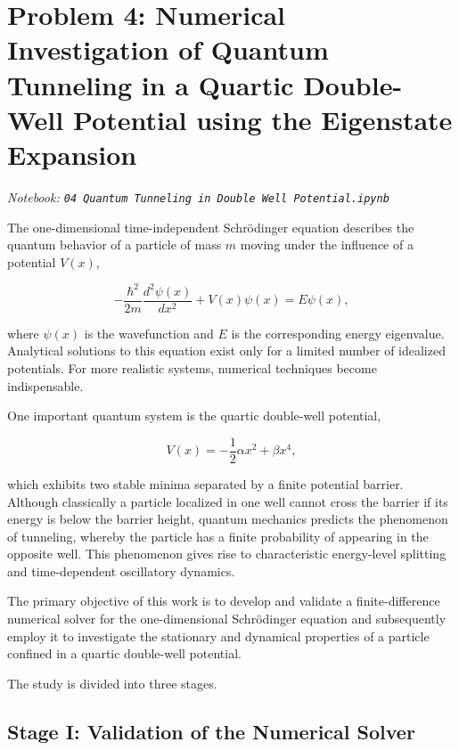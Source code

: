 \documentclass[11pt,a4paper]{article}
\begin{document}
\section{Problem 4: Numerical Investigation of Quantum Tunneling in a Quartic Double-Well Potential using the \textbf{Eigenstate Expansion}}
\textit{Notebook: \texttt{04 Quantum Tunneling in Double Well Potential.ipynb}}
\label{sec:problem4}


The one-dimensional time-independent Schrödinger equation describes the quantum behavior of a particle of mass $m$ moving under the influence of a potential $V(x)$,

\begin{equation}
-\frac{\hbar^2}{2m}\frac{d^2\psi(x)}{dx^2}+V(x)\psi(x)=E\psi(x),
\end{equation}

where $\psi(x)$ is the wavefunction and $E$ is the corresponding energy eigenvalue. Analytical solutions to this equation exist only for a limited number of idealized potentials. For more realistic systems, numerical techniques become indispensable.

One important quantum system is the quartic double-well potential,

\begin{equation}
V(x)=-\frac{1}{2}\alpha x^2+\beta x^4,
\end{equation}

which exhibits two stable minima separated by a finite potential barrier. Although classically a particle localized in one well cannot cross the barrier if its energy is below the barrier height, quantum mechanics predicts the phenomenon of tunneling, whereby the particle has a finite probability of appearing in the opposite well. This phenomenon gives rise to characteristic energy-level splitting and time-dependent oscillatory dynamics.

The primary objective of this work is to develop and validate a finite-difference numerical solver for the one-dimensional Schrödinger equation and subsequently employ it to investigate the stationary and dynamical properties of a particle confined in a quartic double-well potential.

The study is divided into three stages.

\subsection{Stage I: Validation of the Numerical Solver}
\end{document}
